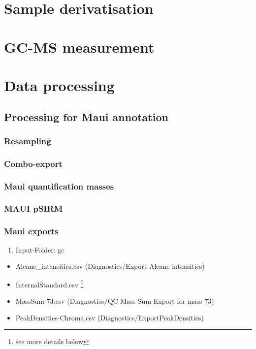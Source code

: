 \documentclass[]{book}
\providecommand{\tightlist}{%
  \setlength{\itemsep}{0pt}\setlength{\parskip}{0pt}}
\let\rmarkdownfootnote\footnote%
\def\footnote{\protect\rmarkdownfootnote}
\theoremstyle{definition}
\theoremstyle{definition}
\theoremstyle{definition}
\theoremstyle{remark}
\begin{document}
\section{Sample derivatisation}\label{sample-derivatisation}

\section{GC-MS measurement}\label{gc-ms-measurement}

\section{Data processing}\label{data-processing}

\subsection{Processing for Maui
annotation}\label{processing-for-maui-annotation}

\subsubsection{Resampling}\label{resampling}

\subsubsection{Combo-export}\label{combo-export}

\subsubsection{Maui quantification
masses}\label{maui-quantification-masses}

\subsubsection{MAUI pSIRM}\label{maui-psirm}

\subsubsection{Maui exports}\label{mauiexport}

\begin{enumerate}
\def\labelenumi{\arabic{enumi}.}
\tightlist
\item
  Input-Folder: gc
\end{enumerate}

\begin{itemize}
\tightlist
\item
  Alcane\_intensities.csv (Diagnostics/Export Alcane intensities)
\item
  InternalStandard.csv \footnote{see more details below}
\item
  MassSum-73.csv (Diagnostics/QC Mass Sum Export for mass 73)
\item
  PeakDensities-Chroma.csv (Diagnostics/ExportPeakDensities)
\end{itemize}
\end{document}
